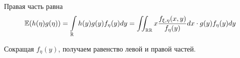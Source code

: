         Правая часть равна
        \begin{equation*}
            \operatorname{\mathbb{E}} (h(\eta) g(\eta))=\int\limits_{\mathbb{R}} h(y) g(y) f_{\eta}(y) d y=\iint_{\mathbb{R} \mathbb{R}} x \frac{f_{\xi, \eta}(x, y)}{f_{\eta}(y)} d x \cdot g(y) f_{\eta}(y) d y
        \end{equation*}
        
        Сокращая $f_{\eta}(y)$, получаем равенство левой и правой частей.
\fi
